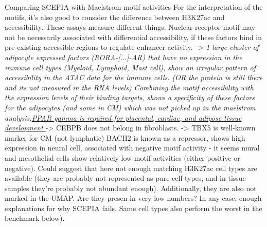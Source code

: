 Comparing SCEPIA with Maelstrom motif activities
For the interpretation of the motifs, it's also good to consider the difference between H3K27ac and accessibility. These assays measure different things. Nuclear receptor motif may not be necessarily associated with differential accessibility, if these factors bind in pre-existing accessible regions to regulate enhancer activity.
\textit{-> 1 large cluster of adipocyte expressed factors (RORA-[...]-AR) that have no expression in the immune cell types (Myeloid, Lymphoid, Mast cell), show an irregular pattern of accessibility in the ATAC data for the immune cells. (OR the protein is still there and its not measured in the RNA levels) Combining the motif accessibility with the expression levels of their binding targets, shows a specificity of these factors for the adipocytes (and some in CM) which was not picked up in the maelstrom analysis.\href{https://www.cell.com/molecular-cell/fulltext/S1097-2765(00)80209-9?_returnURL=https\%3A\%2F\%2Flinkinghub.elsevier.com\%2Fretrieve\%2Fpii\%2FS1097276500802099\%3Fshowall\%3Dtrue}{PPAR gamma is required for placental, cardiac, and adipose tissue development }}
-> CEBPB does not belong in fibroblasts.
-> TBX5 is well-known marker for CM (not lymphatic)
BACH2 is known as a repressor, shows high expression in neural cell, associated with negative motif activity
- it seems mural and mesothelial cells show relatively low motif activities (either positive or negative). Could suggest that here not enough matching H3K27ac cell types are available (they are probably not represented as pure cell types, and in tissue samples they're probably not abundant enough). Additionally, they are also not marked in the UMAP. Are they presen in very low numbers? In any case, enough explanations for why SCEPIA fails. Same cell types also perform the worst in the benchmark below).

